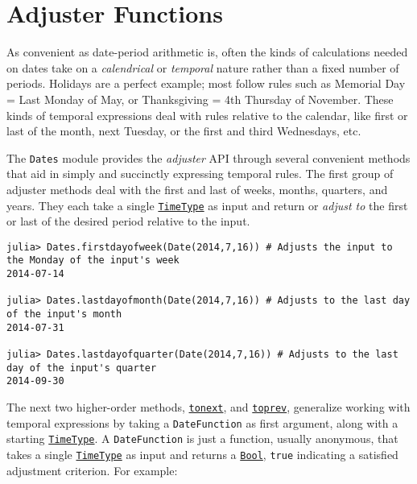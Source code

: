 \hypertarget{13551592780469201884}{}


\section{Adjuster Functions}



As convenient as date-period arithmetic is, often the kinds of calculations needed on dates take on a \emph{calendrical} or \emph{temporal} nature rather than a fixed number of periods. Holidays are a perfect example; most follow rules such as {\textquotedbl}Memorial Day = Last Monday of May{\textquotedbl}, or {\textquotedbl}Thanksgiving = 4th Thursday of November{\textquotedbl}. These kinds of temporal expressions deal with rules relative to the calendar, like first or last of the month, next Tuesday, or the first and third Wednesdays, etc.



The \texttt{Dates} module provides the \emph{adjuster} API through several convenient methods that aid in simply and succinctly expressing temporal rules. The first group of adjuster methods deal with the first and last of weeks, months, quarters, and years. They each take a single \hyperlink{4438614350756187528}{\texttt{TimeType}} as input and return or \emph{adjust to} the first or last of the desired period relative to the input.




\begin{verbatim}
julia> Dates.firstdayofweek(Date(2014,7,16)) # Adjusts the input to the Monday of the input's week
2014-07-14

julia> Dates.lastdayofmonth(Date(2014,7,16)) # Adjusts to the last day of the input's month
2014-07-31

julia> Dates.lastdayofquarter(Date(2014,7,16)) # Adjusts to the last day of the input's quarter
2014-09-30
\end{verbatim}



The next two higher-order methods, \hyperlink{17785923876137601514}{\texttt{tonext}}, and \hyperlink{17852506486502639811}{\texttt{toprev}}, generalize working with temporal expressions by taking a \texttt{DateFunction} as first argument, along with a starting \hyperlink{4438614350756187528}{\texttt{TimeType}}. A \texttt{DateFunction} is just a function, usually anonymous, that takes a single \hyperlink{4438614350756187528}{\texttt{TimeType}} as input and returns a \hyperlink{46725311238864537}{\texttt{Bool}}, \texttt{true} indicating a satisfied adjustment criterion. For example:




